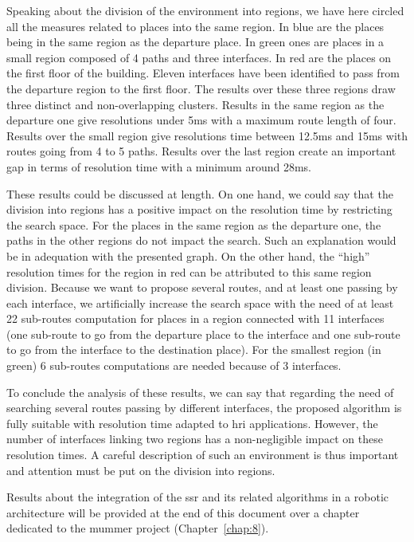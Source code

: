 Speaking about the division of the environment into regions, we have here circled all the measures related to places into the same region. In blue are the places being in the same region as the departure place. In green ones are places in a small region composed of 4 paths and three interfaces. In red are the places on the first floor of the building. Eleven interfaces have been identified to pass from the departure region to the first floor. The results over these three regions draw three distinct and non-overlapping clusters. Results in the same region as the departure one give resolutions under 5ms with a maximum route length of four. Results over the small region give resolutions time between 12.5ms and 15ms with routes going from 4 to 5 paths. Results over the last region create an important gap in terms of resolution time with a minimum around 28ms. 

These results could be discussed at length. On one hand, we could say that the division into regions has a positive impact on the resolution time by restricting the search space. For the places in the same region as the departure one, the paths in the other regions do not impact the search. Such an explanation would be in adequation with the presented graph. On the other hand, the ``high'' resolution times for the region in red can be attributed to this same region division. Because we want to propose several routes, and at least one passing by each interface, we artificially increase the search space with the need of at least 22 sub-routes computation for places in a region connected with 11 interfaces (one sub-route to go from the departure place to the interface and one sub-route to go from the interface to the destination place). For the smallest region (in green) 6 sub-routes computations are needed because of 3 interfaces.

To conclude the analysis of these results, we can say that regarding the need of searching several routes passing by different interfaces, the proposed algorithm is fully suitable with resolution time adapted to \acrshort{hri} applications. However, the number of interfaces linking two regions has a non-negligible impact on these resolution times. A careful description of such an environment is thus important and attention must be put on the division into regions.  

Results about the integration of the \acrshort{ssr} and its related algorithms in a robotic architecture will be provided at the end of this document over a chapter dedicated to the \acrshort{mummer} project (Chapter~\ref{chap:8}).